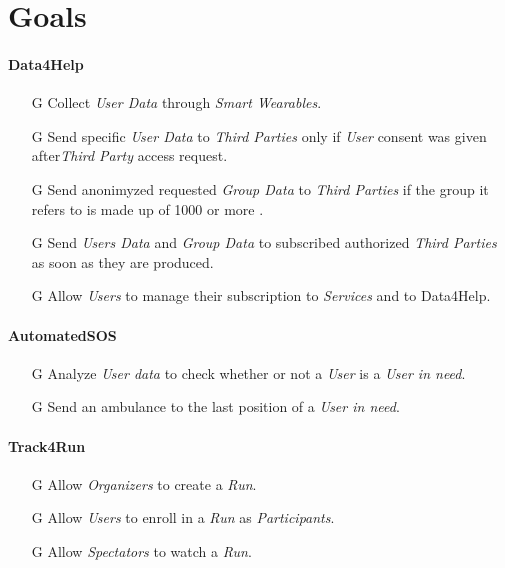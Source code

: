\documentclass[../../rasd.tex]{subfiles}
\begin{document}
\section{Goals}

\paragraph{Data4Help}
\begin{itemize}
	
	\item[G\subs{1}]Collect \textit{User Data} through \textit{Smart Wearables}.
	
	\item[G\subs{2}]Send specific \textit{User Data} to \textit{Third Parties} only if \textit{User} consent was given after\textit{Third Party} access request.
	\item[G\subs{3}]Send anonimyzed requested \textit{Group Data} to \textit{Third Parties} if the group it refers to is made up of 1000 or more .

	\item[G\subs{4}]Send \textit{Users Data} and \textit{Group Data} to subscribed authorized \textit{Third Parties} as soon as they are produced.
	
	\item[G\subs{5}]Allow \textit{Users} to manage their subscription to \textit{Services} and to Data4Help.		
	
\end{itemize}

\paragraph{AutomatedSOS}
\begin{itemize}
	\item[G\subs{6}]Analyze \textit{User data} to check whether or not a \textit{User} is a \textit{User in need}.
	\item[G\subs{7}]Send an ambulance to the last position of a \textit{User in need}.
\end{itemize}

\paragraph{Track4Run}
\begin{itemize}
	\item[G\subs{8}]Allow \textit{Organizers} to create a \textit{Run}.
	\item[G\subs{9}]Allow \textit{Users} to enroll in a \textit{Run} as \textit{Participants}. 
	\item[G\subs{10}]Allow \textit{Spectators} to watch a \textit{Run}.
\end{itemize}
\end{document}
